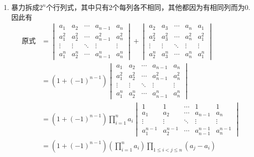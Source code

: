 \begin{enumerate}
    \item 暴力拆成$2^n$个行列式，其中只有2个每列各不相同，其他都因为有相同列而为0. 因此有
          \begin{align*}
              \text{原式} & =\begin{vmatrix}
                                 a_{1}     & a_{2}     & \cdots & a_{n-1}     & a_{n}     \\
                                 a_{1}^{2} & a_{2}^{2} & \cdots & a_{n-1}^{2} & a_{n}^{2} \\
                                 \vdots    & \vdots    & \ddots & \vdots      & \vdots    \\
                                 a_{1}^{n} & a_{2}^{n} & \cdots & a_{n-1}^{n} & a_{n}^{n}
                             \end{vmatrix}+
              \begin{vmatrix}
                  a_{2}     & a_{3}     & \cdots & a_{n}     & a_{1}     \\
                  a_{2}^{2} & a_{3}^{2} & \cdots & a_{n}^{2} & a_{1}^{2} \\
                  \vdots    & \vdots    & \ddots & \vdots    & \vdots    \\
                  a_{2}^{n} & a_{3}^{n} & \cdots & a_{n}^{n} & a_{1}^{n}
              \end{vmatrix}                                               \\
                          & =(1+(-1)^{n-1})\begin{vmatrix}
                                               a_{1}     & a_{2}     & \cdots & a_{n-1}     & a_{n}     \\
                                               a_{1}^{2} & a_{2}^{2} & \cdots & a_{n-1}^{2} & a_{n}^{2} \\
                                               \vdots    & \vdots    & \ddots & \vdots      & \vdots    \\
                                               a_{1}^{n} & a_{2}^{n} & \cdots & a_{n-1}^{n} & a_{n}^{n}
                                           \end{vmatrix}                \\
                          & =(1+(-1)^{n-1})\prod_{i=1}^na_i
              \begin{vmatrix}
                  1           & 1           & \cdots & 1             & 1           \\
                  a_{1}       & a_{2}       & \cdots & a_{n-1}       & a_{n}       \\
                  \vdots      & \vdots      & \ddots & \vdots        & \vdots      \\
                  a_{1}^{n-1} & a_{2}^{n-1} & \cdots & a_{n-1}^{n-1} & a_{n}^{n-1}
              \end{vmatrix}                                     \\
                          & =(1+(-1)^{n-1})\left(\prod_{i=1}^na_i\right)\prod_{1\leqslant i<j\leqslant n}(a_j-a_i) \\
          \end{align*}


\end{enumerate}
